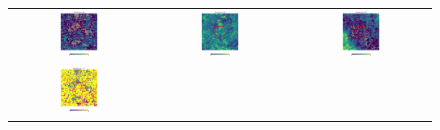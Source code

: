 \documentclass[preprintm,linenumbers]{aastex631}
\begin{document}
\begin{figure}
\begin{tabular}{  c c c}
				\includegraphics[width=0.3\textwidth]{results/skymaps_cutout/skymaps_cutout_first_year_one_snap_v4_0_10yrs_db_noDD_noTwi_tscale-7_nside-256_doAllTemplateMetrics_reduceCount_r_NES_noDD_noTwi.pdf} &
				\includegraphics[width=0.3\textwidth]{results/skymaps_cutout/skymaps_cutout_first_year_one_snap_v4_0_10yrs_db_noDD_noTwi_tscale-7_nside-256_doAllTemplateMetrics_reduceCount_r_WFD_noDD_noTwi.pdf} &
				\includegraphics[width=0.3\textwidth]{results/skymaps_cutout/skymaps_cutout_first_year_one_snap_v4_0_10yrs_db_noDD_noTwi_tscale-7_nside-256_doAllTemplateMetrics_reduceCount_r_GP_noDD_noTwi.pdf} \\
				\includegraphics[width=0.3\textwidth]{results/skymaps_cutout/skymaps_cutout_delta_first_year_one_snap_v4_0_10yrs_db_noDD_noTwi_tscale-7_nside-256_doAllTemplateMetrics_reduceCount_r_NES_noDD_noTwi.pdf} &

\end{tabular}
\end{figure}
\end{document}
